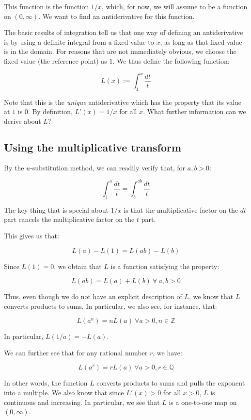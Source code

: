 \documentclass[10pt]{amsart}
\begin{document}
This function is the function $1/x$, which, for now, we will assume to
be a function on $(0,\infty)$. We want to find an antiderivative for
this function.

The basic results of integration tell us that one way of defining an
antiderivative is by using a definite integral from a fixed value to
$x$, as long as that fixed value is in the domain. For reasons that
are not immediately obvious, we choose the fixed value (the reference
point) as $1$. We thus define the following function:

$$L(x) := \int_1^x \frac{dt}{t}$$

Note that this is the {\em unique} antiderivative which has the
property that its value at $1$ is $0$. By definition, $L'(x) = 1/x$
for all $x$. What further information can we derive about $L$?

\subsection{Using the multiplicative transform}

By the $u$-substitution method, we can readily verify that, for $a,b >
0$:

$$\int_1^a \frac{dt}{t} = \int_b^{ab} \frac{dt}{t}$$

The key thing that is special about $1/x$ is that the multiplicative
factor on the $dt$ part cancels the multiplicative factor on the $t$
part.

This gives us that:

$$L(a) - L(1) = L(ab) - L(b)$$

Since $L(1) = 0$, we obtain that $L$ is a function satisfying the property:

$$L(ab) = L(a) + L(b) \ \forall \ a,b > 0$$

Thus, even though we do not have an explicit description of $L$, we
know that $L$ converts products to sums. In particular, we also see,
for instance, that:

$$L(a^n) = nL(a) \ \forall a > 0, n \in \mathbb{Z}$$

In particular, $L(1/a) = -L(a)$.

We can further see that for any rational number $r$, we have:

$$L(a^r) = rL(a) \ \forall a > 0, r \in \mathbb{Q}$$

In other words, the function $L$ converts products to sums and pulls
the exponent into a multiple. We also know that since $L'(x) > 0$ for
all $x > 0$, $L$ is continuous and increasing. In particular, we see
that $L$ is a one-to-one map on $(0,\infty)$.
\end{document}
